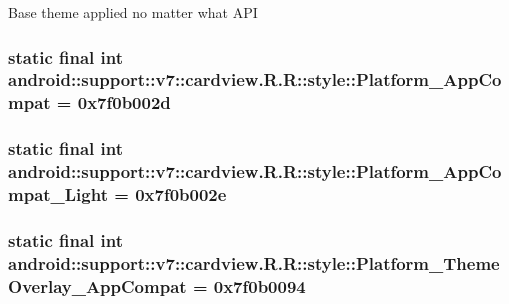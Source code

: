 Base theme applied no matter what API \hypertarget{classandroid_1_1support_1_1v7_1_1cardview_1_1_r_1_1style_d8550e06db4e9f26a777d149a0db7317}{
\subsubsection[{Platform\_\-AppCompat}]{\setlength{\rightskip}{0pt plus 5cm}static final int android::support::v7::cardview.R.R::style::Platform\_\-AppCompat = 0x7f0b002d}}
\label{classandroid_1_1support_1_1v7_1_1cardview_1_1_r_1_1style_d8550e06db4e9f26a777d149a0db7317}


\hypertarget{classandroid_1_1support_1_1v7_1_1cardview_1_1_r_1_1style_62aacc3d9783718c824678fa41763f61}{
\subsubsection[{Platform\_\-AppCompat\_\-Light}]{\setlength{\rightskip}{0pt plus 5cm}static final int android::support::v7::cardview.R.R::style::Platform\_\-AppCompat\_\-Light = 0x7f0b002e}}
\label{classandroid_1_1support_1_1v7_1_1cardview_1_1_r_1_1style_62aacc3d9783718c824678fa41763f61}


\hypertarget{classandroid_1_1support_1_1v7_1_1cardview_1_1_r_1_1style_10612504f8c4555c8583b912f91b90a6}{
\subsubsection[{Platform\_\-ThemeOverlay\_\-AppCompat}]{\setlength{\rightskip}{0pt plus 5cm}static final int android::support::v7::cardview.R.R::style::Platform\_\-ThemeOverlay\_\-AppCompat = 0x7f0b0094}}
\label{classandroid_1_1support_1_1v7_1_1cardview_1_1_r_1_1style_10612504f8c4555c8583b912f91b90a6}


